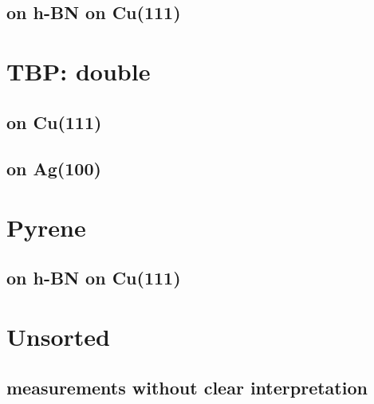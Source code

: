 \documentclass[10pt,a4paper,twoside
]{scrbook}
\begin{document}
   \section{on h-BN on Cu(111)}
      
\printbibliography
\chapter{TBP: double}
   \section{on Cu(111)}
      
   \section{on Ag(100)}
      
\printbibliography
\chapter{Pyrene}
   \section{on h-BN on Cu(111)}
      
\printbibliography
\chapter{Unsorted}
   \section{measurements without clear interpretation}
      
\printbibliography  
\printindex
\backmatter{}
\end{document}
